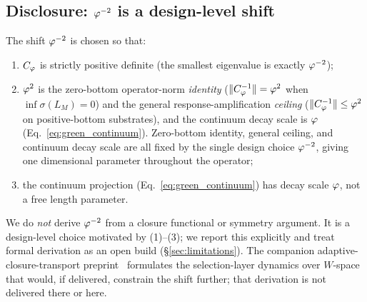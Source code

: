 \subsection{Disclosure: $\varphi^{-2}$ is a design-level shift}

The shift $\varphi^{-2}$ is chosen so that:
\begin{enumerate}\itemsep=2pt
\item $C_{\varphi}$ is strictly positive definite (the smallest eigenvalue
  is exactly $\varphi^{-2}$);
\item $\varphi^{2}$ is the zero-bottom operator-norm
  \emph{identity} ($\|C_{\varphi}^{-1}\| = \varphi^{2}$ when
  $\inf\sigma(L_M)=0$) and the general response-amplification
  \emph{ceiling} ($\|C_{\varphi}^{-1}\| \leq \varphi^{2}$ on positive-bottom
  substrates), and the continuum decay scale is $\varphi$
  (Eq.~\eqref{eq:green_continuum}). Zero-bottom identity, general
  ceiling, and continuum decay scale are all fixed by the single
  design choice $\varphi^{-2}$, giving one dimensional parameter
  throughout the operator;
\item the continuum projection (Eq.~\eqref{eq:green_continuum})
  has decay scale $\varphi$, not a free length parameter.
\end{enumerate}
We do \emph{not} derive $\varphi^{-2}$ from a closure functional or
symmetry argument. It is a design-level choice motivated by
(1)--(3); we report this explicitly and treat formal derivation as
an open build (\S\ref{sec:limitations}). The companion
adaptive-closure-transport
preprint~\citep{SmartAdaptiveClosureTransport2026} formulates the
selection-layer dynamics over $W$-space that would, if delivered,
constrain the shift further; that derivation is not delivered
there or here.

